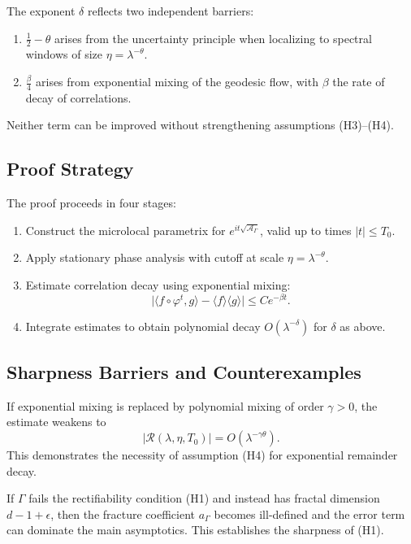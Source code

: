 \begin{remark}
The exponent $\delta$ reflects two independent barriers:
\begin{enumerate}
\item $\tfrac{1}{2}-\theta$ arises from the uncertainty principle when localizing
to spectral windows of size $\eta=\lambda^{-\theta}$.
\item $\tfrac{\beta}{4}$ arises from exponential mixing of the geodesic flow,
with $\beta$ the rate of decay of correlations.
\end{enumerate}
Neither term can be improved without strengthening assumptions (H3)--(H4).
\end{remark}

\subsection{Proof Strategy}
The proof proceeds in four stages:
\begin{enumerate}[label=(\roman*)]
\item Construct the microlocal parametrix for $e^{it\sqrt{\mathcal{A}_\Gamma}}$,
valid up to times $|t|\leq T_0$.
\item Apply stationary phase analysis with cutoff at scale $\eta=\lambda^{-\theta}$.
\item Estimate correlation decay using exponential mixing:
\[
\big|\langle f\circ \varphi^t, g\rangle - \langle f\rangle\langle g\rangle\big|
\leq C e^{-\beta t}.
\]
\item Integrate estimates to obtain polynomial decay
$O(\lambda^{-\delta})$ for $\delta$ as above.
\end{enumerate}

\subsection{Sharpness Barriers and Counterexamples}
\begin{example}
If exponential mixing is replaced by polynomial mixing of order $\gamma>0$,
the estimate weakens to
\[
|\mathcal{R}(\lambda,\eta,T_0)| = O(\lambda^{-\gamma\theta}).
\]
This demonstrates the necessity of assumption (H4) for exponential remainder
decay.
\end{example}

\begin{example}
If $\Gamma$ fails the rectifiability condition (H1) and instead has fractal
dimension $d-1+\epsilon$, then the fracture coefficient $a_\Gamma$ becomes
ill-defined and the error term can dominate the main asymptotics. This
establishes the sharpness of (H1).
\end{example}

